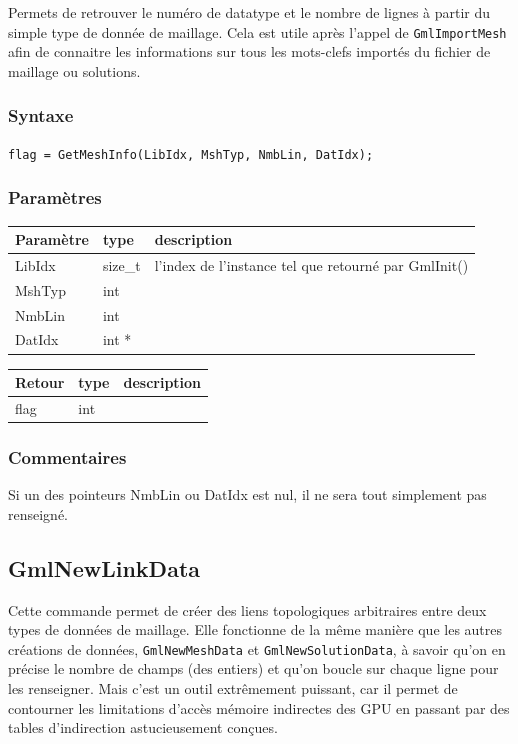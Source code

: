 \documentclass[a4paper,12pt]{article}
\begin{document}
Permets de retrouver le numéro de datatype et le nombre de lignes à partir du simple type de donnée de maillage.
Cela est utile après l'appel de {\tt GmlImportMesh} afin de connaitre les informations sur tous les mots-clefs importés du fichier de maillage ou solutions.

\subsubsection*{Syntaxe}

{\tt flag = GetMeshInfo(LibIdx, MshTyp, NmbLin, DatIdx);}

\subsubsection*{Paramètres}

\begin{tabular}{|m{2cm}|m{1.5cm}|m{10.5cm}|}
\hline
Paramètre  & type    & description \\
\hline
LibIdx     & size\_t & l'index de l'instance tel que retourné par GmlInit() \\
\hline
MshTyp     & int     &  \\
\hline
NmbLin     & int     &  \\
\hline
DatIdx     & int *   &  \\
\hline
\end{tabular}

\medskip

\begin{tabular}{|m{2cm}|m{1.5cm}|m{10.5cm}|}
\hline
Retour     & type   & description \\
\hline
flag       & int    & \\
\hline
\end{tabular}

\subsubsection*{Commentaires}

Si un des pointeurs NmbLin ou DatIdx est nul, il ne sera tout simplement pas renseigné.


\subsection{GmlNewLinkData}

Cette commande permet de créer des liens topologiques arbitraires entre deux types de données de maillage.
Elle fonctionne de la même manière que les autres créations de données, {\tt GmlNewMeshData} et {\tt GmlNewSolutionData}, à savoir qu'on en précise le nombre de champs (des entiers) et qu'on boucle sur chaque ligne pour les renseigner.
Mais c'est un outil extrêmement puissant, car il permet de contourner les limitations d'accès mémoire indirectes des GPU en passant par des tables d'indirection astucieusement conçues.
\end{document}
